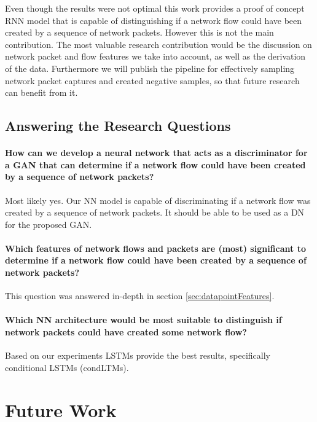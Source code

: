 \documentclass[
	ngerman,
	ruledheaders=section,%
	class=report,%
	thesis={type=bachelor},%
	accentcolor=9c,%
	custommargins=true,%
	marginpar=false,%
	parskip=half-,%
	fontsize=11pt,%
	twoside
]{tudapub}
\begin{document}
Even though the results were not optimal this work provides a proof of concept RNN model that is capable of distinguishing if a network flow could have been created by a sequence of network packets.
However this is not the main contribution.
The most valuable research contribution would be the discussion on network packet and flow features we take into account, as well as the derivation of the data.
Furthermore we will publish the pipeline for effectively sampling network packet captures and created negative samples, so that future research can benefit from it.

\subsection{Answering the Research Questions}
\label{sec:answers}

\paragraph{How can we develop a neural network that acts as a discriminator for a GAN that can determine if a network flow could have been created by a sequence of network packets?}
Most likely yes.
Our NN model is capable of discriminating if a network flow was created by a sequence of network packets.
It should be able to be used as a DN for the proposed GAN.

\paragraph{Which features of network flows and packets are (most) significant to determine if a network flow could have been created by a sequence of network packets?}
This question was answered in-depth in section \ref{sec:datapointFeatures}.

\paragraph{Which NN architecture would be most suitable to distinguish if network packets could have created some network flow?}
Based on our experiments LSTMs provide the best results, specifically conditional LSTMs (condLTMs).

\section{Future Work}
\label{sec:futureWork}
\end{document}

